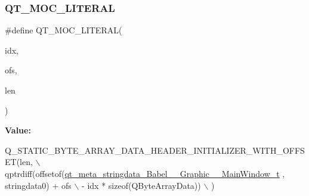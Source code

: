 \subsubsection{\texorpdfstring{Q\+T\+\_\+\+M\+O\+C\+\_\+\+L\+I\+T\+E\+R\+AL}{QT\_MOC\_LITERAL}}
{\footnotesize\ttfamily \#define Q\+T\+\_\+\+M\+O\+C\+\_\+\+L\+I\+T\+E\+R\+AL(\begin{DoxyParamCaption}\item[{}]{idx,  }\item[{}]{ofs,  }\item[{}]{len }\end{DoxyParamCaption})}

{\bfseries Value\+:}
\begin{DoxyCode}
Q\_STATIC\_BYTE\_ARRAY\_DATA\_HEADER\_INITIALIZER\_WITH\_OFFSET(len, \(\backslash\)
    qptrdiff(offsetof(\hyperlink{structqt__meta__stringdata__Babel____Graphic____MainWindow__t}{qt\_meta\_stringdata\_Babel\_\_Graphic\_\_MainWindow\_t}
      , stringdata0) + ofs \(\backslash\)
        - idx * \textcolor{keyword}{sizeof}(QByteArrayData)) \(\backslash\)
    )
\end{DoxyCode}
